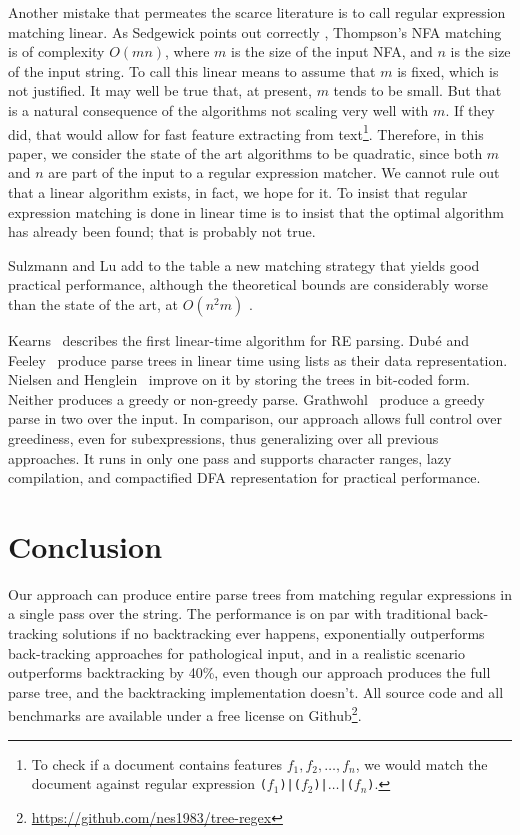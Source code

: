 \documentclass[english,twocolumn]{article}
\theoremstyle{definition}
\begin{document}
Another mistake that permeates the scarce literature is to call
regular expression matching linear. As Sedgewick points out correctly
\cite{Sedg90a}, Thompson's NFA matching is of complexity $O(mn)$,
where $m$ is the size of the input NFA, and $n$ is the size of the
input string. To call this linear means to assume that $m$ is fixed,
which is not justified. It may well be true that, at present, $m$
tends to be small. But that is a natural consequence of the algorithms
not scaling very well with $m$. If they did, that would allow for
fast feature extracting from text\footnote{To check if a document
contains features $f_1, f_2, \dots, f_n$, we would match the document
against regular expression \texttt{($f_1$)|($f_2$)|$\dots$|($f_n$)}.}.
Therefore, in this paper, we consider the state of the art algorithms
to be quadratic, since both $m$ and $n$ are part of the input to a
regular expression matcher. We cannot rule out that a linear algorithm
exists, in fact, we hope for it.  To insist that regular expression
matching is done in linear time is to insist that the optimal
algorithm has already been found; that is probably not true.

Sulzmann and Lu add to the table a new matching strategy that yields
good practical performance, although the theoretical bounds are considerably
worse than the state of the art, at $O(n^{2}m)$ \cite{Sulz12a}.

Kearns~\cite{Kear91a} describes the first linear-time algorithm for RE parsing.
Dub\'e and Feeley~\cite{Dube00a} produce parse trees in linear time using lists
as their data representation. Nielsen and Henglein~\cite{Niel11a} improve on it
by storing the trees in bit-coded form.  Neither produces a greedy or
non-greedy parse.  Grathwohl~\cite{Grat13a} produce a greedy parse in two over
the input.  In comparison, our approach allows full control over greediness,
even for subexpressions, thus generalizing over all previous approaches. It
runs in only one pass and supports character ranges, lazy compilation, and
compactified DFA representation for practical performance.

\section{Conclusion}
Our approach can produce entire parse trees from matching regular expressions
in a single pass over the string.  The performance is on par with traditional
back-tracking solutions if no backtracking ever happens, exponentially
outperforms back-tracking approaches for pathological input, and in a realistic
scenario outperforms backtracking by 40\%, even though our approach produces
the full parse tree, and the backtracking implementation doesn't. All source
code and all benchmarks are available under a free license on
Github\footnote{\url{https://github.com/nes1983/tree-regex}}.



\end{document}
